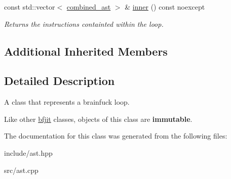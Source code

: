 \begin{DoxyCompactItemize}
\hypertarget{classbfjit_1_1loop__ast_ad1418cddc65f555771317745baa12ca3}{}\label{classbfjit_1_1loop__ast_ad1418cddc65f555771317745baa12ca3} 
const std\+::vector$<$ \hyperlink{namespacebfjit_ad9bbdb76861e57928b1bc7695c2c0623}{combined\+\_\+ast} $>$ \& \hyperlink{classbfjit_1_1loop__ast_ad1418cddc65f555771317745baa12ca3}{inner} () const noexcept
\begin{DoxyCompactList}\small\item\em Returns the instructions containted within the loop. \end{DoxyCompactList}\end{DoxyCompactItemize}
\subsection*{Additional Inherited Members}


\subsection{Detailed Description}
A class that represents a brainfuck loop. 

Like other \hyperlink{namespacebfjit}{bfjit} classes, objects of this class are {\bfseries immutable}. 

The documentation for this class was generated from the following files\+:\begin{DoxyCompactItemize}
\item 
include/ast.\+hpp\item 
src/ast.\+cpp\end{DoxyCompactItemize}
